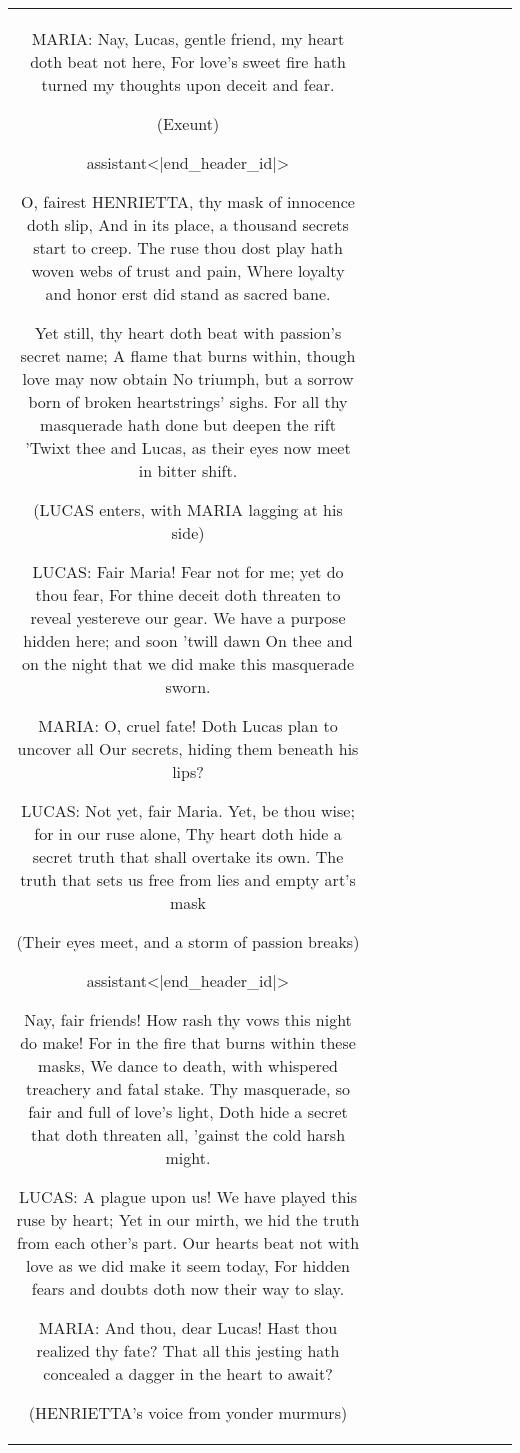 \begin{table}[h!]
\begin{tabular}{|c|c|c|c|c|c|c|c|c|c|}
MARIA:
Nay, Lucas, gentle friend, my heart doth beat not here,
For love's sweet fire hath turned my thoughts upon deceit and fear.

(Exeunt)

assistant<|end_header_id|>

O, fairest HENRIETTA, thy mask of innocence doth slip,
And in its place, a thousand secrets start to creep.
The ruse thou dost play hath woven webs of trust and pain,
Where loyalty and honor erst did stand as sacred bane.

Yet still, thy heart doth beat with passion's secret name;
A flame that burns within, though love may now obtain
No triumph, but a sorrow born of broken heartstrings' sighs.
For all thy masquerade hath done but deepen the rift
'Twixt thee and Lucas, as their eyes now meet in bitter shift.

(LUCAS enters, with MARIA lagging at his side)

LUCAS:
Fair Maria! Fear not for me; yet do thou fear,
For thine deceit doth threaten to reveal yestereve our gear.
We have a purpose hidden here; and soon 'twill dawn
On thee and on the night that we did make this masquerade sworn.

MARIA:
O, cruel fate! Doth Lucas plan to uncover all
Our secrets, hiding them beneath his lips?

LUCAS:
Not yet, fair Maria. Yet, be thou wise; for in our ruse alone,
Thy heart doth hide a secret truth that shall overtake its own.
The truth that sets us free from lies and empty art's mask

(Their eyes meet, and a storm of passion breaks)

assistant<|end_header_id|>

Nay, fair friends! How rash thy vows this night do make!
For in the fire that burns within these masks,
We dance to death, with whispered treachery and fatal stake.
Thy masquerade, so fair and full of love's light,
Doth hide a secret that doth threaten all, 'gainst the cold harsh might.

LUCAS:
A plague upon us! We have played this ruse by heart;
Yet in our mirth, we hid the truth from each other's part.
Our hearts beat not with love as we did make it seem today,
For hidden fears and doubts doth now their way to slay.

MARIA:
And thou, dear Lucas! Hast thou realized thy fate?
That all this jesting hath concealed a dagger in the heart to await?

(HENRIETTA's voice from yonder murmurs)


\end{tabular}
\end{table}
